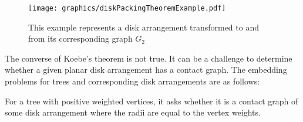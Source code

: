 \begin{figure}[!hbtp]
\begin{center}
\texttt{[image: graphics/diskPackingTheoremExample.pdf]}
\end{center} 
\caption{This example represents a disk arrangement transformed to and from its corresponding graph 
$G_2$}
\label{fig:DiskArrangement-1}
\end{figure}

The converse of Koebe's theorem is not true.
It can be a challenge to determine whether a given planar disk arrangement has a contact graph.
The embedding problems for trees and corresponding disk arrangements are as follows:
\begin{prob}\label{problem:UnorderedTree}
For a tree with positive weighted vertices, it asks whether it is a contact graph of some 
disk arrangement where the radii are equal to the vertex weights.
\end{prob}

